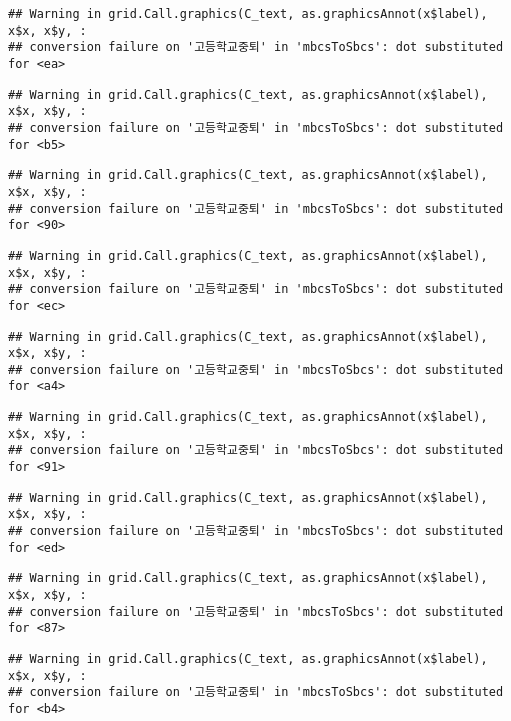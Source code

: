\documentclass[
]{article}
\begin{document}
\begin{verbatim}
## Warning in grid.Call.graphics(C_text, as.graphicsAnnot(x$label), x$x, x$y, :
## conversion failure on '고등학교중퇴' in 'mbcsToSbcs': dot substituted for <ea>
\end{verbatim}

\begin{verbatim}
## Warning in grid.Call.graphics(C_text, as.graphicsAnnot(x$label), x$x, x$y, :
## conversion failure on '고등학교중퇴' in 'mbcsToSbcs': dot substituted for <b5>
\end{verbatim}

\begin{verbatim}
## Warning in grid.Call.graphics(C_text, as.graphicsAnnot(x$label), x$x, x$y, :
## conversion failure on '고등학교중퇴' in 'mbcsToSbcs': dot substituted for <90>
\end{verbatim}

\begin{verbatim}
## Warning in grid.Call.graphics(C_text, as.graphicsAnnot(x$label), x$x, x$y, :
## conversion failure on '고등학교중퇴' in 'mbcsToSbcs': dot substituted for <ec>
\end{verbatim}

\begin{verbatim}
## Warning in grid.Call.graphics(C_text, as.graphicsAnnot(x$label), x$x, x$y, :
## conversion failure on '고등학교중퇴' in 'mbcsToSbcs': dot substituted for <a4>
\end{verbatim}

\begin{verbatim}
## Warning in grid.Call.graphics(C_text, as.graphicsAnnot(x$label), x$x, x$y, :
## conversion failure on '고등학교중퇴' in 'mbcsToSbcs': dot substituted for <91>
\end{verbatim}

\begin{verbatim}
## Warning in grid.Call.graphics(C_text, as.graphicsAnnot(x$label), x$x, x$y, :
## conversion failure on '고등학교중퇴' in 'mbcsToSbcs': dot substituted for <ed>
\end{verbatim}

\begin{verbatim}
## Warning in grid.Call.graphics(C_text, as.graphicsAnnot(x$label), x$x, x$y, :
## conversion failure on '고등학교중퇴' in 'mbcsToSbcs': dot substituted for <87>
\end{verbatim}

\begin{verbatim}
## Warning in grid.Call.graphics(C_text, as.graphicsAnnot(x$label), x$x, x$y, :
## conversion failure on '고등학교중퇴' in 'mbcsToSbcs': dot substituted for <b4>
\end{verbatim}
\end{document}
